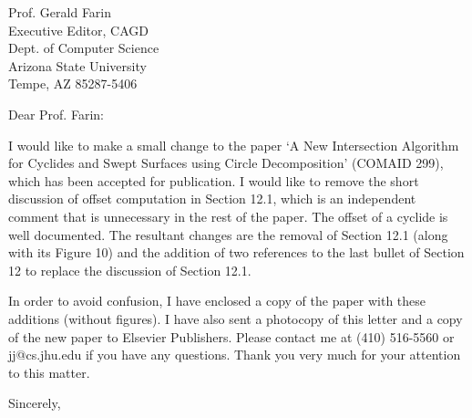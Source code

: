 \signature{Prof. John K. Johnstone\\jj@cs.jhu.edu}

\begin{letter}
{Prof. Gerald Farin\\
Executive Editor, CAGD\\
Dept. of Computer Science\\
Arizona State University\\
Tempe, AZ 85287-5406
}

\opening{Dear Prof. Farin:}

I would like to make a small change to the paper 
`A New Intersection Algorithm for Cyclides and Swept Surfaces
using Circle Decomposition' (COMAID 299), which has been 
accepted for publication.
I would like to remove the short discussion of offset computation
in Section 12.1, which is an independent comment that is unnecessary
in the rest of the paper.
The offset of a cyclide is well documented.
The resultant changes are the removal of Section 12.1 (along with its
Figure 10) and 
the addition of two references to the last bullet of Section 12 to replace
the discussion of Section 12.1.

In order to avoid confusion, I have enclosed a copy of the paper with these
additions (without figures).  
I have also sent a photocopy of this letter and a copy of the new paper
to Elsevier Publishers.
Please contact me at (410) 516-5560 or jj@cs.jhu.edu if you have any questions.
Thank you very much for your attention to this matter.

\closing{Sincerely,}
\end{letter}

